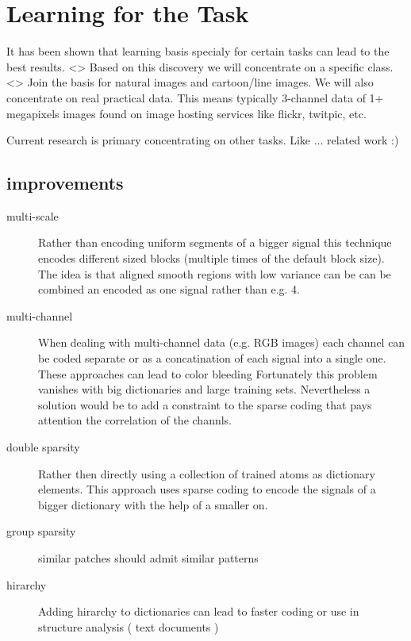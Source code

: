 \section{Learning for the Task}
It has been shown that learning basis specialy for certain tasks can lead to the best results\cite{}.  <>
Based on this discovery we will concentrate on a specific class. <> Join the basis for natural images and cartoon/line images.
We will also concentrate on real practical data. This means typically 3-channel data of 1+ megapixels images found on image hosting services like flickr, twitpic, etc.

Current research is primary concentrating on other tasks. 
Like ... related work :)

\subsection{improvements}

\begin{description}
\item[multi-scale]
Rather than encoding uniform segments of a bigger signal this technique encodes different sized 
blocks (multiple times of the default block size). The idea is that aligned smooth regions with low variance can be 
can be combined an encoded as one signal rather than e.g. 4. \cite{saprio}

\item[multi-channel]
When dealing with multi-channel data (e.g. RGB images) 
each channel can be coded separate or as a concatination of each signal into a single one.
These approaches can lead to color bleeding \cite{mairal08sparse} 
Fortunately this problem vanishes with big dictionaries and large training sets. \cite{mairal08sparse}
Nevertheless a solution would be to add a constraint to the sparse coding that pays attention the correlation of the channls.

\item[double sparsity]
Rather then directly using a collection of trained atoms as dictionary elements. This approach uses sparse coding
to encode the signals of a bigger dictionary with the help of a smaller on. \cite{double sparsity} 

\item[group sparsity]
similar patches should admit similar patterns
\cite{double sparsity}

\item[hirarchy]
Adding hirarchy to dictionaries can lead to faster coding or use in structure analysis ( text documents )
\cite{Jenatton2010}

\end{description}




